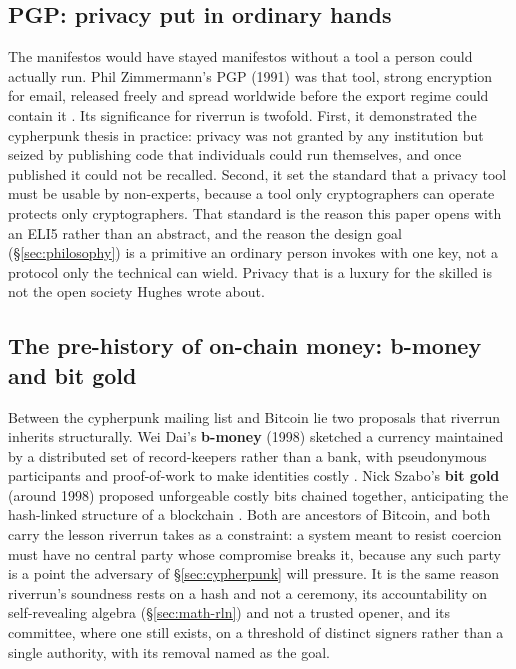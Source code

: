 \documentclass[11pt]{article}
\begin{document}
\subsection{PGP: privacy put in ordinary hands}

The manifestos would have stayed manifestos without a tool a person could actually run.
Phil Zimmermann's PGP (1991) was that tool, strong encryption for email, released freely
and spread worldwide before the export regime could contain it \cite{pgp}. Its
significance for riverrun is twofold. First, it demonstrated the cypherpunk thesis in
practice: privacy was not granted by any institution but seized by publishing code that
individuals could run themselves, and once published it could not be recalled. Second, it
set the standard that a privacy tool must be usable by non-experts, because a tool only
cryptographers can operate protects only cryptographers. That standard is the reason this
paper opens with an ELI5 rather than an abstract, and the reason the design goal
(\S\ref{sec:philosophy}) is a primitive an ordinary person invokes with one key, not a
protocol only the technical can wield. Privacy that is a luxury for the skilled is not the
open society Hughes wrote about.

\subsection{The pre-history of on-chain money: b-money and bit gold}

Between the cypherpunk mailing list and Bitcoin lie two proposals that riverrun inherits
structurally. Wei Dai's \textbf{b-money} (1998) sketched a currency maintained by a
distributed set of record-keepers rather than a bank, with pseudonymous participants and
proof-of-work to make identities costly \cite{bmoney}. Nick Szabo's \textbf{bit gold}
(around 1998) proposed unforgeable costly bits chained together, anticipating the
hash-linked structure of a blockchain \cite{bitgold}. Both are ancestors of Bitcoin, and
both carry the lesson riverrun takes as a constraint: a system meant to resist coercion
must have no central party whose compromise breaks it, because any such party is a point
the adversary of \S\ref{sec:cypherpunk} will pressure. It is the same reason riverrun's
soundness rests on a hash and not a ceremony, its accountability on self-revealing algebra
(\S\ref{sec:math-rln}) and not a trusted opener, and its committee, where one still exists,
on a threshold of distinct signers rather than a single authority, with its removal named
as the goal.
\end{document}
